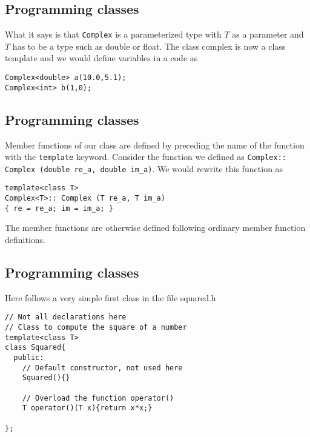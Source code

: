 \documentclass[%
oneside,                 %
final,                   %
10pt]{article}
\begin{document}
\subsection*{Programming classes}

What it says is that \Verb!Complex! is a parameterized type with $T$ as a parameter and $T$ has to be a type such as double
or float.
The class complex is now a class template
and we would define variables in a code as

\begin{verbatim}
Complex<double> a(10.0,5.1);
Complex<int> b(1,0);
\end{verbatim}

\subsection*{Programming classes}

Member functions of our class are defined by preceding the name of the function with the \Verb!template! keyword.
Consider the function we defined as \Verb!Complex:: Complex (double re_a, double im_a)!.
We would rewrite this function as

\begin{verbatim}
template<class T>
Complex<T>:: Complex (T re_a, T im_a)
{ re = re_a; im = im_a; }
\end{verbatim}
The member functions  are otherwise defined following ordinary member function definitions.

\subsection*{Programming classes}

Here follows a very simple first class in the file squared.h

\begin{verbatim}
// Not all declarations here
// Class to compute the square of a number
template<class T>
class Squared{
  public:
    // Default constructor, not used here
    Squared(){}

    // Overload the function operator()
    T operator()(T x){return x*x;}

};
\end{verbatim}
\end{document}
